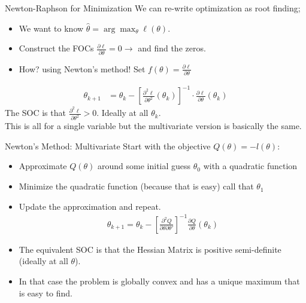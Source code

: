 \documentclass[aspectratio=169]{beamer}
\begin{document}
\begin{frame}{Newton-Raphson for Minimization}
We can re-write \alert{optimization} as \alert{root finding};
\begin{itemize}
\item We want to know $\hat{\theta} = \arg \max_{\theta} \ell(\theta)$.
\item Construct the FOCs $\frac{\partial \ell}{\partial \theta}=0 \rightarrow$  and find the zeros.
\item How? using Newton's method! Set $f(\theta) = \frac{\partial \ell}{\partial \theta}$
\end{itemize}
\begin{align*}
\theta_{k+1} &= \theta_k -  \left[ \frac{\partial^2 \ell}{\partial \theta^2}(\theta_k) \right]^{-1} \cdot \frac{\partial \ell}{\partial \theta}(\theta_k)
\end{align*}
The SOC is that $ \frac{\partial^2 \ell}{\partial \theta^2} >0$. Ideally at all $\theta_k$.\\
This is all for a \alert{single variable} but the \alert{multivariate} version is basically the same.
\end{frame}


\begin{frame}{Newton's Method: Multivariate}
Start with the objective $Q(\theta) = - l(\theta)$:
\begin{itemize}
\item Approximate $Q(\theta)$ around some initial guess $\theta_0$ with a quadratic function
\item Minimize the quadratic function (because that is easy) call that $\theta_1$
\item Update the approximation and repeat.
\begin{align*}
\theta_{k+1} = \theta_k - \left[ \frac{\partial^2 Q}{\partial \theta \partial \theta'} \right]^{-1}\frac{\partial Q}{\partial \theta}(\theta_k)
\end{align*}
\item The equivalent SOC is that the {Hessian Matrix} is \alert{positive semi-definite}  (ideally at all $\theta$).
\item In that case the problem is \alert{globally convex} and has a \alert{unique maximum} that is easy to find.
\end{itemize}
\end{frame}
\end{document}
